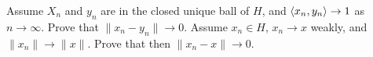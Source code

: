\begin{enumerate}
\begin{excopy}
\begin{itemize}
Assume \(X_n\) and \(y_n\) are in the closed unique ball of $H$,
and \(\langle x_n, y_n \rangle \to 1\) as \(n\to\infty\).
Prove that \(\|x_n -y_n\| \to 0\).
Assume \(x_n\in H\), \(x_n\to x\) weakly, and \(\|x_n\| \to \|x\|\).
Prove that then \(\|x_n - x\|\to 0\).
\end{itemize}
\end{excopy}

\unfinished

\end{enumerate}



